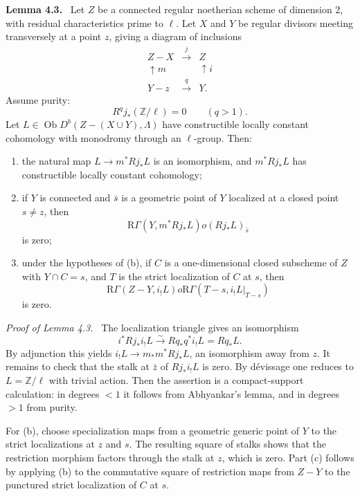 \documentclass[12pt]{article}
\newcommand{\ZZ}{\mathbb Z}
\newcommand{\ob}{\operatorname{Ob}}
\newcommand{\R}{\mathrm R}
\newenvironment{statement}[1]{\par\medskip\noindent\textbf{#1.}\ }{\par\medskip}
\newenvironment{prooftext}[1][Proof]{\par\noindent\emph{#1.}\ }{\par\medskip}
\begin{document}
\begin{statement}{Lemma 4.3}
Let $Z$ be a connected regular noetherian scheme of dimension $2$, with residual characteristics prime to $\ell$. Let $X$ and $Y$ be regular divisors meeting transversely at a point $z$, giving a diagram of inclusions
\[
\begin{array}{ccccc}
Z-X & \xrightarrow{j} & Z\\
\uparrow m & & \uparrow i\\
Y-z & \xrightarrow{q} & Y.
\end{array}
\]
Assume purity:
\[
   R^qj_*(\ZZ/\ell)=0\qquad(q>1).
\]
Let $L\in\ob D^b(Z-(X\cup Y),\Lambda)$ have constructible locally constant cohomology with monodromy through an $\ell$-group. Then:
\begin{enumerate}[label=(\alph*)]
\item the natural map $L\to m^*Rj_*L$ is an isomorphism, and $m^*Rj_*L$ has constructible locally constant cohomology;
\item if $Y$ is connected and $\bar s$ is a geometric point of $Y$ localized at a closed point $s\ne z$, then
\[
   \R\Gamma(Y,m^*Rj_*L)	o (Rj_*L)_{\bar s}
\]
is zero;
\item under the hypotheses of (b), if $C$ is a one-dimensional closed subscheme of $Z$ with $Y\cap C=s$, and $T$ is the strict localization of $C$ at $s$, then
\[
   \R\Gamma(Z-Y,i_!L)	o \R\Gamma(T-s,i_!L|_{T-s})
\]
is zero.
\end{enumerate}
\end{statement}

\begin{prooftext}[Proof of Lemma 4.3]
The localization triangle gives an isomorphism
\[
   i^*Rj_*i_!L\xrightarrow{\sim}Rq_*q^*i_!L=Rq_*L.
\]
By adjunction this yields $i_!L\to m_*m^*Rj_*L$, an isomorphism away from $z$. It remains to check that the stalk at $\bar z$ of $Rj_*i_!L$ is zero. By dévissage one reduces to $L=\ZZ/\ell$ with trivial action. Then the assertion is a compact-support calculation: in degrees $<1$ it follows from Abhyankar's lemma, and in degrees $>1$ from purity.

For (b), choose specialization maps from a geometric generic point of $Y$ to the strict localizations at $z$ and $s$. The resulting square of stalks shows that the restriction morphism factors through the stalk at $z$, which is zero. Part (c) follows by applying (b) to the commutative square of restriction maps from $Z-Y$ to the punctured strict localization of $C$ at $s$.
\end{prooftext}
\end{document}
